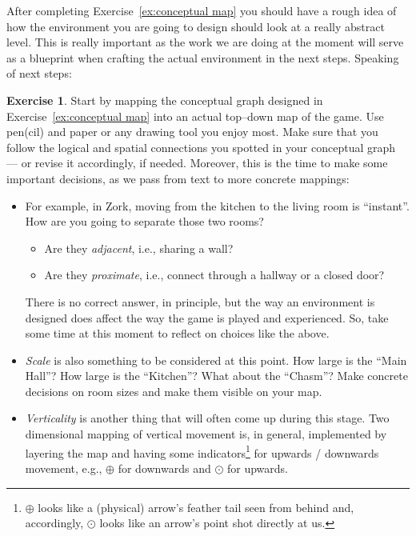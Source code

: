 \documentclass[a4paper]{tufte-handout}
\theoremstyle{definition}
\newtheorem{exercise}{Exercise}
\begin{document}
	After completing Exercise~\ref{ex:conceptual map} you should have a rough idea of how the environment you are going to design should look at a really abstract level. This is really important as the work we are doing at the moment will serve as a blueprint when crafting the actual environment in the next steps. Speaking of next steps:
	
	\begin{exercise}\label{ex:2d map}
		Start by mapping the conceptual graph designed in Exercise~\ref{ex:conceptual map} into an actual top--down map of the game. Use pen(cil) and paper or any drawing tool you enjoy most. Make sure that you follow the logical and spatial connections you spotted in your conceptual graph --- or revise it accordingly, if needed. Moreover, this is the time to make some important decisions, as we pass from text to more concrete mappings:
		\begin{itemize}
			\item For example, in Zork, moving from the kitchen to the living room is ``instant''. How are you going to separate those two rooms?
			\begin{itemize}
				\item Are they \emph{adjacent}, i.e., sharing a wall?
				\item Are they \emph{proximate}, i.e., connect through a hallway or a closed door?
			\end{itemize}
			There is no correct answer, in principle, but the way an environment is designed does affect the way the game is played and experienced. So, take some time at this moment to reflect on choices like the above.
			\item \emph{Scale} is also something to be considered at this point. How large is the ``Main Hall''? How large is the ``Kitchen''? What about the ``Chasm''? Make concrete decisions on room sizes and make them visible on your map.
			\item \emph{Verticality} is another thing that will often come up during this stage. Two dimensional mapping of vertical movement is, in general, implemented by layering the map and having some indicators\footnote{$\oplus$ looks like a (physical) arrow's feather tail seen from behind and, accordingly, $\odot$ looks like an arrow's point shot directly at us.} for upwards / downwards movement, e.g., $\oplus$ for downwards and $\odot$ for upwards.
		\end{itemize}
	\end{exercise}
\end{document}
